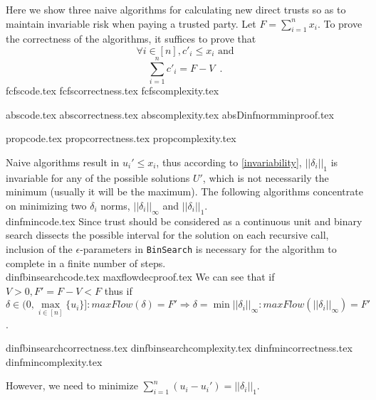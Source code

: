 \documentclass[11pt]{llncs}
\begin{document}
  Here we show three naive algorithms for calculating new direct trusts so as to maintain invariable risk when paying
  a trusted party. Let $F = \sum\limits_{i=1}^{n}x_i$. To prove the correctness of the algorithms, it suffices to prove that
  \begin{equation}
  \label{naive:req1}
     \forall i \in [n], c'_i \leq x_i \mbox{ and}
  \end{equation}
  \begin{equation}
  \label{naive:req2}
     \sum\limits_{i=1}^{n}c'_i = F - V \enspace.
  \end{equation}
  {fcfscode.tex}
  {fcfscorrectness.tex}
  {fcfscomplexity.tex}

  {abscode.tex}
  {abscorrectness.tex}
  {abscomplexity.tex}
  {absDinfnormminproof.tex}

  {propcode.tex}
  {propcorrectness.tex}
  {propcomplexity.tex}

  Naive algorithms result in $u_i' \leq x_i$, thus according to \ref{invariability}, $||\delta_i||_1$ is invariable for
  any of the possible solutions $U'$, which is not necessarily the minimum (usually it will be the maximum). The following
  algorithms concentrate on minimizing two $\delta_i$ norms, $||\delta_i||_\infty$ and $||\delta_i||_1$. \\
  {dinfmincode.tex}
  Since trust should be considered as a continuous unit and binary search dissects the possible interval for the solution
  on each recursive call, inclusion of the $\epsilon$-parameters in \texttt{BinSearch} is necessary for the algorithm to
  complete in a finite number of steps. \\
  {dinfbinsearchcode.tex}
  {maxflowdecproof.tex}
  We can see that if $V > 0, F' = F - V < F$ thus if $\delta \in (0, \max\limits_{i \in [n]}\{u_i\}]:
  maxFlow(\delta)= F' \Rightarrow \delta = \min||\delta_i||_\infty : maxFlow(||\delta_i||_\infty) = F'$.

  {dinfbinsearchcorrectness.tex}
  {dinfbinsearchcomplexity.tex}
  {dinfmincorrectness.tex}
  {dinfmincomplexity.tex}

  However, we need to minimize $\sum\limits_{i=1}^{n}(u_i-u_i') = ||\delta_i||_1$.
\end{document}
